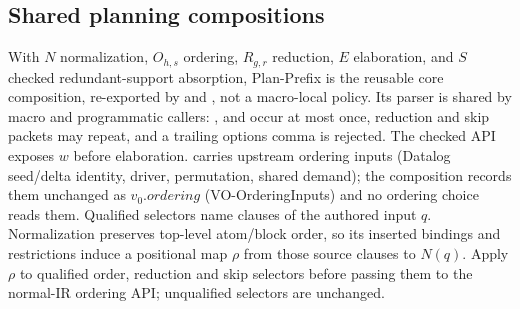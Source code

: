 \subsection{Shared planning compositions}
With $N$ normalization, $O_{h,s}$ ordering, $R_{g,r}$ reduction, $E$ elaboration,
and $S$ checked redundant-support absorption, Plan-Prefix is the reusable
 core composition, re-exported by
 and , not a macro-local policy.
Its  parser is shared by macro and programmatic callers:
,  and  occur at most once, reduction and skip
packets may repeat, and a trailing options comma is rejected. The checked
 API exposes $w$ before elaboration.
 carries upstream ordering inputs (Datalog seed/delta
identity, driver, permutation, shared demand); the composition records them
unchanged as $v_0.ordering$ (VO-OrderingInputs) and no ordering choice reads them.
Qualified  selectors name clauses of the authored input $q$.
Normalization preserves top-level atom/block order, so its inserted bindings
and restrictions induce a positional map $\rho$ from those source clauses
to $N(q)$. Apply $\rho$ to qualified order, reduction and skip selectors before
passing them to the normal-IR ordering API; unqualified selectors are unchanged.
